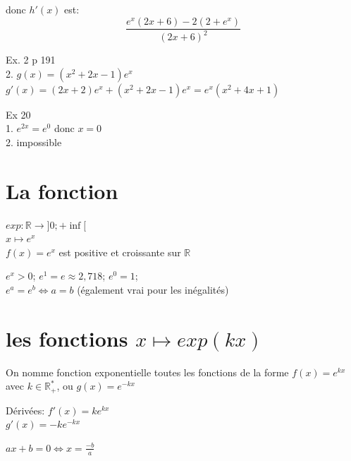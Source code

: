 \documentclass[12pt]{article}
\begin{document}
donc $h'(x)$ est:
$$
    \frac{e^x(2x+6) - 2(2 + e^x)}{(2x+6)^2}
$$

Ex. 2 p 191\\
2. $g(x) = (x^2 + 2x-1)e^x$\\
$g'(x) = (2x + 2)e^x + (x^2 + 2x-1)e^x = e^x(x^2 + 4x + 1)$

Ex 20\\
1. $e^{2x} = e^0$ donc $x = 0$\\
2. impossible

\section{La fonction}

$exp: \mathbb{R} \rightarrow{} ]0; +\inf[$\\
$x \mapsto e^x$\\
$f(x) = e^x$ est positive et croissante sur $\mathbb{R}$

$e^x > 0$; $e^1 = e \approx 2,718$; $e^0 = 1$; \\ $e^a = e^b \iff a = b$ (également vrai pour les inégalités)

\section{les fonctions $x \mapsto exp(kx)$}
On nomme fonction exponentielle toutes les fonctions de la forme $f(x) = e^{kx}$ avec $k \in \mathbb{R}^*_+$, ou $g(x) = e^{-kx}$

Dérivées: $f'(x) = ke^{kx}$\\
$g'(x) = -ke^{-kx}$

$ax+b = 0 \iff x = \frac{-b}{a} $
\end{document}
